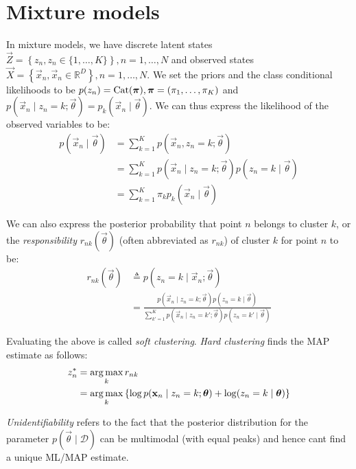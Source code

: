 \section{Mixture models}
In mixture models, we have discrete latent states $\vec Z = \left\{z_n, z_n \in \{1, \dotsc, K\}\right\}, n = 1, \dotsc, N$ and observed states $\vec X = \left\{\vec x_n, \vec x_n \in \mathbb R^D\right\}, n = 1, \dotsc, N$. We set the priors and the class conditional likelihoods to be $p(z_n) = \operatorname{Cat}(\boldsymbol{\mathbf{\pi}}), \boldsymbol{\mathbf{\pi}} = (\pi_1, \dotsc, \pi_K)$ and $p(\vec x_n \mid z_n = k; \vec \theta) = p_k(\vec x_n \mid \vec \theta)$. We can thus express the likelihood of the observed variables to be:
\begin{align}
    p(\vec x_n \mid \vec \theta)    &= \sum_{k = 1}^K p(\vec x_n, z_n = k; \vec \theta) \nonumber\\
                                    &= \sum_{k = 1}^K p(\vec x_n \mid z_n = k; \vec \theta) p(z_n = k \mid \vec \theta) \nonumber\\
                                    &= \sum_{k = 1}^K \pi_k p_k(\vec x_n \mid \vec \theta) \label{eqn:models/mm/lik}
\end{align}

We can also express the posterior probability that point $n$ belongs to cluster $k$, or the \emph{responsibility} $r_{nk}(\vec \theta)$ (often abbreviated as $r_{nk}$) of cluster $k$ for point $n$ to be:
\begin{align}
    r_{nk}(\vec \theta) &\triangleq p(z_n = k \mid \vec x_n; \vec \theta) \nonumber\\
                        &= \frac{p(\vec x_n \mid z_n = k; \vec \theta) p(z_n = k \mid \vec \theta)}{\sum_{k' = 1}^K p(\vec x_n \mid z_n = k'; \vec \theta) p(z_n = k' \mid \vec \theta)} \label{eqn:models-mm-responsibility}
\end{align}

Evaluating the above is called \emph{soft clustering}. \emph{Hard clustering} finds the MAP estimate as follows:
\begin{align}
    z_n^\ast    &= \operatorname*{arg\,max}_k r_{nk} \nonumber\\
                &= \operatorname*{arg\,max}_k \left\{\log p(\boldsymbol{\mathbf{x}}_n \mid z_n = k; \boldsymbol{\mathbf{\theta}}) + \log(z_n = k \mid \boldsymbol{\mathbf{\theta}})\right\}
\end{align}

\emph{Unidentifiability} refers to the fact that the posterior distribution for the parameter $p(\vec \theta \mid \mathcal D)$ can be multimodal (with equal peaks) and hence cant find a unique ML/MAP estimate.

